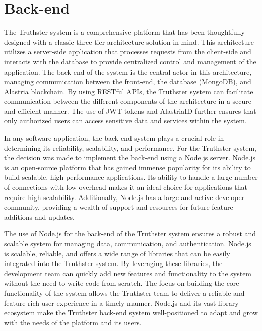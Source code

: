 \documentclass[target=mst,aauheader=]{thud}
\begin{document}
\section{Back-end}

The Truthster system is a comprehensive platform that has been thoughtfully designed with a classic three-tier architecture\cite{3tierArchitecture} solution in mind. This architecture utilizes a server-side application that processes requests from the client-side and interacts with the database to provide centralized control and management of the application. The back-end of the system is the central actor in this architecture, managing communication between the front-end, the database (MongoDB), and Alastria blockchain. By using RESTful APIs\cite{restAPI}, the Truthster system can facilitate communication between the different components of the architecture in a secure and efficient manner. The use of JWT tokens\cite{jwtTokens} and AlastriaID further ensures that only authorized users can access sensitive data and services within the system.\par
In any software application, the back-end system plays a crucial role in determining its reliability, scalability, and performance. For the Truthster system, the decision was made to implement the back-end using a Node.js server\cite{nodeJs}. Node.js is an open-source platform that has gained immense popularity for its ability to build scalable, high-performance applications. Its ability to handle a large number of connections with low overhead makes it an ideal choice for applications that require high scalability. Additionally, Node.js has a large and active developer community, providing a wealth of support and resources for future feature additions and updates.\par
The use of Node.js for the back-end of the Truthster system ensures a robust and scalable system for managing data, communication, and authentication. Node.js is scalable, reliable, and offers a wide range of libraries that can be easily integrated into the Truthster system. By leveraging these libraries, the development team can quickly add new features and functionality to the system without the need to write code from scratch. The focus on building the core functionality of the system allows the Truthster team to deliver a reliable and feature-rich user experience in a timely manner. Node.js and its vast library ecosystem make the Truthster back-end system well-positioned to adapt and grow with the needs of the platform and its users.\par
\end{document}
